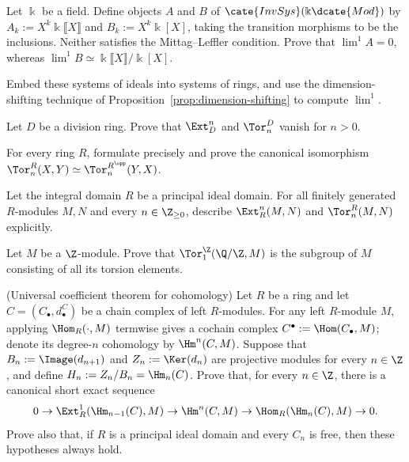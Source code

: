 \begin{Exercises}
	\item Let $\Bbbk$ be a field. Define objects $A$ and $B$ of
	$\cate{InvSys}(\Bbbk\dcate{Mod})$ by
	$A_k:=X^k\Bbbk\llbracket X\rrbracket$ and
	$B_k:=X^k\Bbbk[X]$, taking the transition morphisms to be the inclusions.
	Neither satisfies the Mittag--Leffler condition. Prove that
	$\lim\nolimits^1A=0$, whereas
	$\lim\nolimits^1B\simeq
	\Bbbk\llbracket X\rrbracket/\Bbbk[X]$.
	\begin{hint}
		Embed these systems of ideals into systems of rings, and use the
		dimension-shifting technique of Proposition~\ref{prop:dimension-shifting}
		to compute $\lim\nolimits^1$.
	\end{hint}

	\item Let $D$ be a division ring. Prove that $\Ext_D^n$ and $\Tor_n^D$
	vanish for $n>0$.

	\item For every ring $R$, formulate precisely and prove the canonical
	isomorphism $\Tor_n^R(X,Y)\simeq\Tor_n^{R^{\opp}}(Y,X)$.

	\item Let the integral domain $R$ be a principal ideal domain. For all
	finitely generated $R$-modules $M,N$ and every $n\in\Z_{\geq0}$,
	describe $\Ext_R^n(M,N)$ and $\Tor_n^R(M,N)$ explicitly.

	\item Let $M$ be a $\Z$-module. Prove that $\Tor_1^\Z(\Q/\Z,M)$ is the
	subgroup of $M$ consisting of all its torsion elements.

	\item (Universal coefficient theorem for cohomology) Let $R$ be a ring
	and let $C=(C_\bullet,d^C_\bullet)$ be a chain complex of left
	$R$-modules. For any left $R$-module $M$, applying
	$\Hom_R(\cdot,M)$ termwise gives a cochain complex
	$C^\bullet:=\Hom(C_\bullet,M)$; denote its degree-$n$ cohomology by
	$\Hm^n(C,M)$. Suppose that
	$B_n:=\Image(d_{n+1})$ and $Z_n:=\Ker(d_n)$ are projective modules for
	every $n\in\Z$, and define $H_n:=Z_n/B_n=\Hm_n(C)$. Prove that, for
	every $n\in\Z$, there is a canonical short exact sequence
	\[
		0\to\Ext_R^1(\Hm_{n-1}(C),M)
		\to\Hm^n(C,M)
		\to\Hom_R(\Hm_n(C),M)\to0.
	\]
	Prove also that, if $R$ is a principal ideal domain and every $C_n$ is
	free, then these hypotheses always hold.


\end{Exercises}
